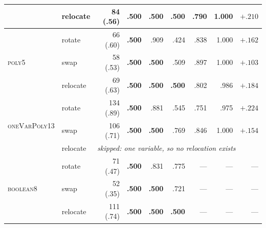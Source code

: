 \begin{table}[H]
\begin{tabular}{l l r rrr rr r}
 & relocate &  84 (.56) & \textbf{.500} & \textbf{.500} & \textbf{.500} & .790 & 1.000 & $\mathbf{+.210}$ \\
\midrule
\multirow{3}{*}{\textsc{poly5}}
 & rotate   &  66 (.60) & \textbf{.500} & .909 & .424 & .838 & 1.000 & $+.162$ \\
 & swap     &  58 (.53) & \textbf{.500} & \textbf{.500} & .509 & .897 & 1.000 & $+.103$ \\
 & relocate &  69 (.63) & \textbf{.500} & \textbf{.500} & \textbf{.500} & .802 & .986 & $\mathbf{+.184}$ \\
\midrule
\multirow{3}{*}{\textsc{oneVarPoly13}}
 & rotate   & 134 (.89) & \textbf{.500} & .881 & .545 & .751 & .975 & $+.224$ \\
 & swap     & 106 (.71) & \textbf{.500} & \textbf{.500} & .769 & .846 & 1.000 & $+.154$ \\
 & relocate & \multicolumn{7}{l}{\emph{skipped: one variable, so no relocation exists}} \\
\midrule
\multirow{3}{*}{\textsc{boolean8}}
 & rotate   &  71 (.47) & \textbf{.500} & .831 & .775 & --- & --- & --- \\
 & swap     &  52 (.35) & \textbf{.500} & \textbf{.500} & .721 & --- & --- & --- \\
 & relocate & 111 (.74) & \textbf{.500} & \textbf{.500} & \textbf{.500} & --- & --- & --- \\
\bottomrule
\end{tabular}
\end{table}
